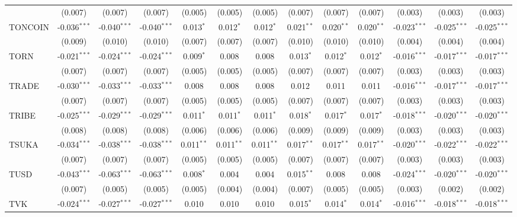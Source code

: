 \begin{table}[!htbp]
\begin{tabular}{@{\extracolsep{5pt}}lcccccccccccc}
  & (0.007) & (0.007) & (0.007) & (0.005) & (0.005) & (0.005) & (0.007) & (0.007) & (0.007) & (0.003) & (0.003) & (0.003) \\
 TONCOIN & -0.036$^{***}$ & -0.040$^{***}$ & -0.040$^{***}$ & 0.013$^{*}$ & 0.012$^{*}$ & 0.012$^{*}$ & 0.021$^{**}$ & 0.020$^{**}$ & 0.020$^{**}$ & -0.023$^{***}$ & -0.025$^{***}$ & -0.025$^{***}$ \\
  & (0.009) & (0.010) & (0.010) & (0.007) & (0.007) & (0.007) & (0.010) & (0.010) & (0.010) & (0.004) & (0.004) & (0.004) \\
 TORN & -0.021$^{***}$ & -0.024$^{***}$ & -0.024$^{***}$ & 0.009$^{*}$ & 0.008$^{}$ & 0.008$^{}$ & 0.013$^{*}$ & 0.012$^{*}$ & 0.012$^{*}$ & -0.016$^{***}$ & -0.017$^{***}$ & -0.017$^{***}$ \\
  & (0.007) & (0.007) & (0.007) & (0.005) & (0.005) & (0.005) & (0.007) & (0.007) & (0.007) & (0.003) & (0.003) & (0.003) \\
 TRADE & -0.030$^{***}$ & -0.033$^{***}$ & -0.033$^{***}$ & 0.008$^{}$ & 0.008$^{}$ & 0.008$^{}$ & 0.012$^{}$ & 0.011$^{}$ & 0.011$^{}$ & -0.016$^{***}$ & -0.017$^{***}$ & -0.017$^{***}$ \\
  & (0.007) & (0.007) & (0.007) & (0.005) & (0.005) & (0.005) & (0.007) & (0.007) & (0.007) & (0.003) & (0.003) & (0.003) \\
 TRIBE & -0.025$^{***}$ & -0.029$^{***}$ & -0.029$^{***}$ & 0.011$^{*}$ & 0.011$^{*}$ & 0.011$^{*}$ & 0.018$^{*}$ & 0.017$^{*}$ & 0.017$^{*}$ & -0.018$^{***}$ & -0.020$^{***}$ & -0.020$^{***}$ \\
  & (0.008) & (0.008) & (0.008) & (0.006) & (0.006) & (0.006) & (0.009) & (0.009) & (0.009) & (0.003) & (0.003) & (0.003) \\
 TSUKA & -0.034$^{***}$ & -0.038$^{***}$ & -0.038$^{***}$ & 0.011$^{**}$ & 0.011$^{**}$ & 0.011$^{**}$ & 0.017$^{**}$ & 0.017$^{**}$ & 0.017$^{**}$ & -0.020$^{***}$ & -0.022$^{***}$ & -0.022$^{***}$ \\
  & (0.007) & (0.007) & (0.007) & (0.005) & (0.005) & (0.005) & (0.007) & (0.007) & (0.007) & (0.003) & (0.003) & (0.003) \\
 TUSD & -0.043$^{***}$ & -0.063$^{***}$ & -0.063$^{***}$ & 0.008$^{*}$ & 0.004$^{}$ & 0.004$^{}$ & 0.015$^{**}$ & 0.008$^{}$ & 0.008$^{}$ & -0.024$^{***}$ & -0.020$^{***}$ & -0.020$^{***}$ \\
  & (0.007) & (0.005) & (0.005) & (0.005) & (0.004) & (0.004) & (0.007) & (0.005) & (0.005) & (0.003) & (0.002) & (0.002) \\
 TVK & -0.024$^{***}$ & -0.027$^{***}$ & -0.027$^{***}$ & 0.010$^{}$ & 0.010$^{}$ & 0.010$^{}$ & 0.015$^{*}$ & 0.014$^{*}$ & 0.014$^{*}$ & -0.016$^{***}$ & -0.018$^{***}$ & -0.018$^{***}$ \\

\end{tabular}
\end{table}
